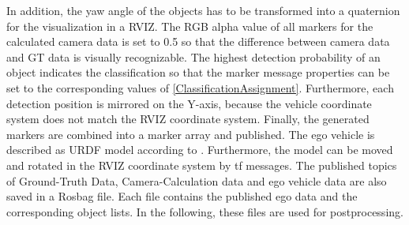In addition, the yaw angle of the objects has to be transformed into a quaternion for the visualization in a \ac{RVIZ}. The RGB alpha value of all markers for the calculated camera data is set to 0.5 so that the difference between camera data and GT data is visually recognizable. 
The highest detection probability of an object indicates the classification so that the marker message properties can be set to the corresponding values of \cref{ClassificationAssignment}. Furthermore, each detection position is mirrored on the Y-axis, because the vehicle coordinate system does not match the \ac{RVIZ} coordinate system. Finally, the generated markers are combined into a marker array and published.
The ego vehicle is described as URDF model according to \cite{URDF}.
Furthermore, the model can be moved and rotated in the \ac{RVIZ} coordinate system by tf messages. 
The published topics of Ground-Truth Data, Camera-Calculation data and ego vehicle data are also saved in a Rosbag file. Each file contains the published ego data and the corresponding object lists. In the following, these files are used for postprocessing.